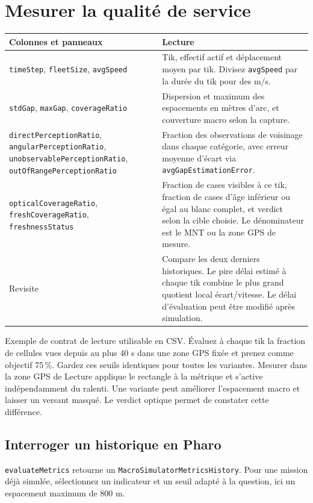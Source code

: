 \documentclass[11pt,a4paper]{article}
\newcommand{\sel}[1]{\texttt{#1}}
\newcommand{\ui}[1]{\textsf{#1}}
\begin{document}
\section{Mesurer la qualité de service}
\begin{tabularx}{\linewidth}{@{}>{\raggedright\arraybackslash}p{.41\linewidth}Y@{}}
\toprule
Colonnes et panneaux & Lecture \\
\midrule
\sel{timeStep}, \sel{fleetSize}, \sel{avgSpeed} & Tik, effectif actif et déplacement moyen par tik. Divisez \sel{avgSpeed} par la durée du tik pour des m/s. \\
\sel{stdGap}, \sel{maxGap}, \sel{coverageRatio} & Dispersion et maximum des espacements en mètres d'arc, et couverture macro selon la capture. \\
\sel{directPerceptionRatio}, \sel{angularPerceptionRatio}, \sel{unobservablePerceptionRatio}, \sel{outOfRangePerceptionRatio} & Fraction des observations de voisinage dans chaque catégorie, avec erreur moyenne d'écart via \sel{avgGapEstimationError}. \\
\sel{opticalCoverageRatio}, \sel{freshCoverageRatio}, \sel{freshnessStatus} & Fraction de cases visibles à ce tik, fraction de cases d'âge inférieur ou égal au blanc complet, et verdict selon la cible choisie. Le dénominateur est le MNT ou la zone GPS de mesure. \\
\ui{Revisite} & Compare les deux derniers historiques. Le pire délai estimé à chaque tik combine le plus grand quotient local écart/vitesse. Le délai d'évaluation peut être modifié après simulation. \\
\bottomrule
\end{tabularx}

Exemple de contrat de lecture utilisable en CSV. Évaluez à chaque tik la fraction de cellules vues depuis au plus 40 s dans une zone GPS fixée et prenez comme objectif 75\,\%. Gardez ces seuils identiques pour toutes les variantes. \ui{Mesurer dans la zone GPS de Lecture} applique le rectangle à la métrique et s'active indépendamment du ralenti. Une variante peut améliorer l'espacement macro et laisser un versant masqué. Le verdict optique permet de constater cette différence.

\subsection{Interroger un historique en Pharo}
\sel{evaluateMetrics} retourne un \sel{MacroSimulatorMetricsHistory}. Pour une mission déjà simulée, sélectionnez un indicateur et un seuil adapté à la question, ici un espacement maximum de 800 m.
\end{document}
